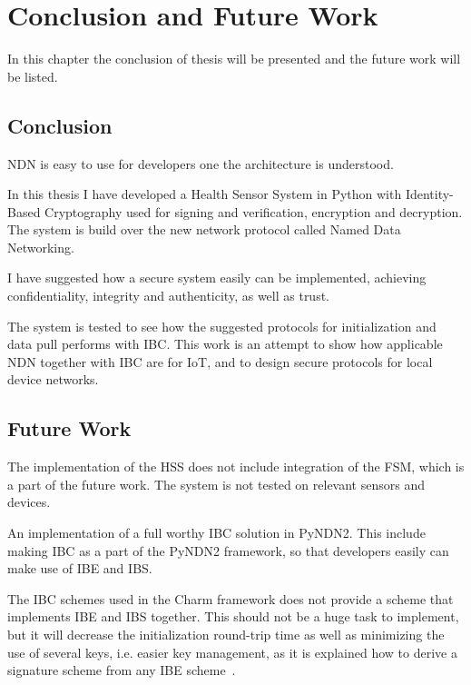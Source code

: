 \chapter{Conclusion and Future Work}\label{chp7:conclusion}
In this chapter the conclusion of thesis will be presented and the future work will be listed.

\section{Conclusion}
\gls{NDN} is easy to use for developers one the architecture is understood. 

In this thesis I have developed a Health Sensor System in Python with Identity-Based Cryptography used for signing and verification, encryption and decryption.
The system is build over the new network protocol called Named Data Networking.

I have suggested how a secure system easily can be implemented, achieving confidentiality, integrity and authenticity, as well as trust.

The system is tested to see how the suggested protocols for initialization and data pull performs with \gls{IBC}. 
This work is an attempt to show how applicable \gls{NDN} together with \gls{IBC} are for \gls{IoT}, and to design secure protocols for local device networks.

\section{Future Work}
The implementation of the \gls{HSS} does not include integration of the \gls{FSM}, which is a part of the future work.
The system is not tested on relevant sensors and devices.

An implementation of a full worthy \gls{IBC} solution in \gls{PyNDN2}.
This include making \gls{IBC} as a part of the PyNDN2 framework, so that developers easily can make use of \gls{IBE} and \gls{IBS}.

The \gls{IBC} schemes used in the Charm framework does not provide a scheme that implements \gls{IBE} and \gls{IBS} together.
This should not be a huge task to implement, but it will decrease the initialization round-trip time as well as minimizing the use of several keys, i.e. easier key management, as it is explained how to derive a signature scheme from any \gls{IBE} scheme~\cite[Section 4]{DBLP:conf/crypto/Waters09}.
